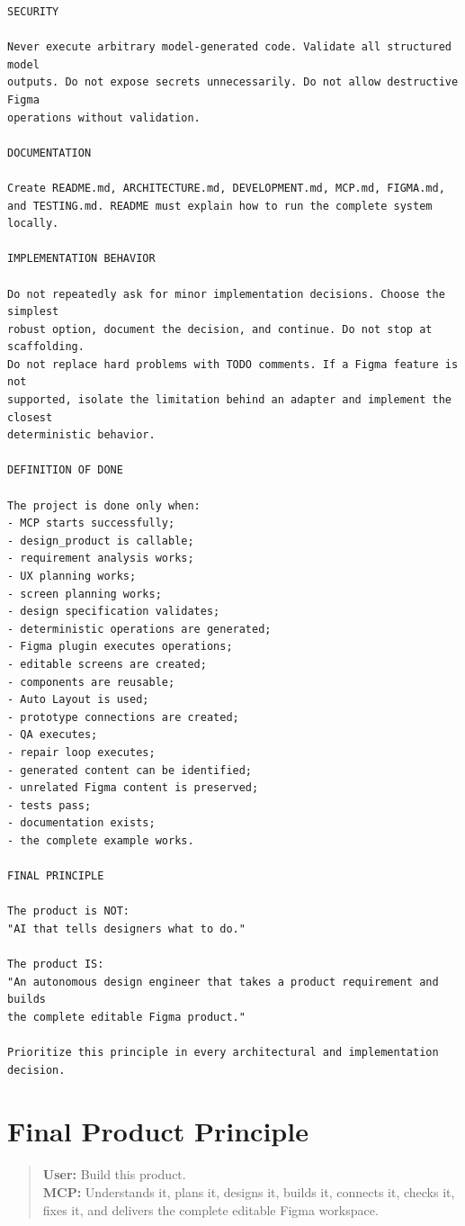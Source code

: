\documentclass[11pt,a4paper]{article}
\begin{document}
\begin{lstlisting}
SECURITY

Never execute arbitrary model-generated code. Validate all structured model
outputs. Do not expose secrets unnecessarily. Do not allow destructive Figma
operations without validation.

DOCUMENTATION

Create README.md, ARCHITECTURE.md, DEVELOPMENT.md, MCP.md, FIGMA.md,
and TESTING.md. README must explain how to run the complete system locally.

IMPLEMENTATION BEHAVIOR

Do not repeatedly ask for minor implementation decisions. Choose the simplest
robust option, document the decision, and continue. Do not stop at scaffolding.
Do not replace hard problems with TODO comments. If a Figma feature is not
supported, isolate the limitation behind an adapter and implement the closest
deterministic behavior.

DEFINITION OF DONE

The project is done only when:
- MCP starts successfully;
- design_product is callable;
- requirement analysis works;
- UX planning works;
- screen planning works;
- design specification validates;
- deterministic operations are generated;
- Figma plugin executes operations;
- editable screens are created;
- components are reusable;
- Auto Layout is used;
- prototype connections are created;
- QA executes;
- repair loop executes;
- generated content can be identified;
- unrelated Figma content is preserved;
- tests pass;
- documentation exists;
- the complete example works.

FINAL PRINCIPLE

The product is NOT:
"AI that tells designers what to do."

The product IS:
"An autonomous design engineer that takes a product requirement and builds
the complete editable Figma product."

Prioritize this principle in every architectural and implementation decision.
\end{lstlisting}

\section{Final Product Principle}
\begin{quote}
\textbf{User:} Build this product.\\
\textbf{MCP:} Understands it, plans it, designs it, builds it, connects it, checks it, fixes it, and delivers the complete editable Figma workspace.
\end{quote}
\end{document}
